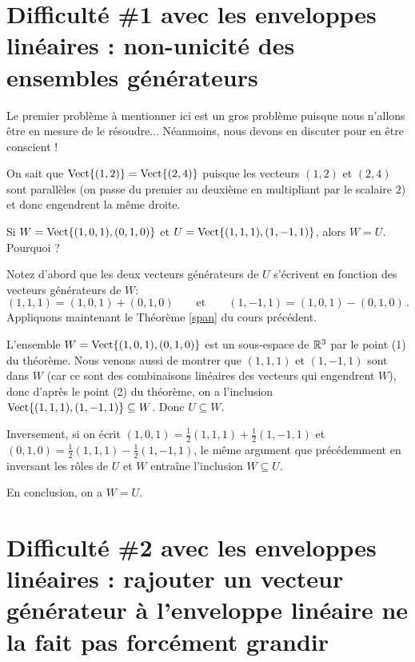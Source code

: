 \section[Difficulté avec les enveloppes lin\'eaires, I]{Difficulté \#1 avec les enveloppes lin\'eaires : non-unicité des ensembles g\'en\'erateurs}

Le premier problème à mentionner ici est un gros problème puisque nous n'allons  être en mesure de le
résoudre... Néanmoins, nous devons en discuter pour en être conscient ! 

\begin{myexample} On sait que $\textrm{Vect}\{(1,2)\} = \textrm{Vect}\{(2,4)\}$ puisque les vecteurs $(1,2)$ et $(2,4)$ sont parallèles (on passe du premier au deuxième en multipliant par le scalaire $2$) et donc engendrent la même droite. 
 \end{myexample}

\begin{myexample} Si $W = \textrm{Vect}\{ (1,0,1), (0,1,0)\}$ et $U = \textrm{Vect}\{ (1,1,1), (1,-1,1)\}$, alors $W=U$.  Pourquoi ? 

Notez d'abord que les deux vecteurs générateurs de $U$ s'écrivent en fonction des vecteurs générateurs de $W$: $$(1,1,1) = (1,0,1)+ (0,1,0) \quad\quad \text{et}\quad\quad (1,-1,1)=(1,0,1)-(0,1,0)\,.$$
Appliquons maintenant le Théorème \ref{span} du cours précédent.

L'ensemble $W = \textrm{Vect}\{ (1,0,1), (0,1,0)\}$ est un sous-espace de $\mathbb{R}^3$ par le point (1) du théorème.  
Nous venons aussi de montrer que
$(1,1,1)$ et $(1,-1,1)$ sont dans $W$ (car ce sont des combinaisons linéaires 
des vecteurs qui engendrent $W$), donc d'apr\`es le point (2) du théorème, on a l'inclusion $\textrm{Vect}\{ (1,1,1), (1,-1,1)\} \subseteq W$.
Donc $U \subseteq W$.

Inversement, si on écrit $(1,0,1) = \frac12(1,1,1)+\frac12(1,-1,1)$ et
$(0,1,0) = \frac12(1,1,1)-\frac12(1,-1,1)$, le
même argument que précédemment en inversant les rôles de $U$ et $W$ entraîne l'inclusion $W \subseteq U$.

En conclusion, on a $W=U$.
\end{myexample}


\section[Difficulté avec les enveloppes lin\'eaires, II]{Difficulté \#2 avec les enveloppes lin\'eaires : rajouter un vecteur générateur à l'enveloppe linéaire ne la fait pas forcément grandir}

